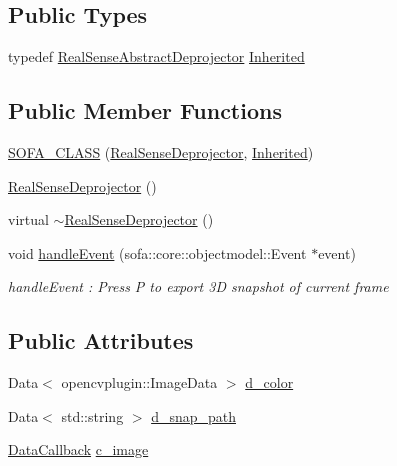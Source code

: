 \subsection*{Public Types}
\begin{DoxyCompactItemize}
\item 
typedef \hyperlink{classsofa_1_1rgbdtracking_1_1_real_sense_abstract_deprojector}{Real\+Sense\+Abstract\+Deprojector} \hyperlink{classsofa_1_1rgbdtracking_1_1_real_sense_deprojector_a6bae03808ffd8dcb3a90e7ed450cac45}{Inherited}
\end{DoxyCompactItemize}
\subsection*{Public Member Functions}
\begin{DoxyCompactItemize}
\item 
\hyperlink{classsofa_1_1rgbdtracking_1_1_real_sense_deprojector_ab83880605bbf09764e64573381b5502c}{S\+O\+F\+A\+\_\+\+C\+L\+A\+SS} (\hyperlink{classsofa_1_1rgbdtracking_1_1_real_sense_deprojector}{Real\+Sense\+Deprojector}, \hyperlink{classsofa_1_1rgbdtracking_1_1_real_sense_abstract_deprojector_a9b4cae154f99cca58b05da9c4b0084ab}{Inherited})
\item 
\hyperlink{classsofa_1_1rgbdtracking_1_1_real_sense_deprojector_af790460a9054321625fce41ed8949964}{Real\+Sense\+Deprojector} ()
\item 
virtual \hyperlink{classsofa_1_1rgbdtracking_1_1_real_sense_deprojector_ac600a5143334b96795ec161eac613aa9}{$\sim$\+Real\+Sense\+Deprojector} ()
\item 
void \hyperlink{classsofa_1_1rgbdtracking_1_1_real_sense_deprojector_aaa5648b58d79dcabc8265d7eec19b78a}{handle\+Event} (sofa\+::core\+::objectmodel\+::\+Event $\ast$event)
\begin{DoxyCompactList}\small\item\em handle\+Event \+: Press P to export 3D snapshot of current frame \end{DoxyCompactList}\end{DoxyCompactItemize}
\subsection*{Public Attributes}
\begin{DoxyCompactItemize}
\item 
Data$<$ opencvplugin\+::\+Image\+Data $>$ \hyperlink{classsofa_1_1rgbdtracking_1_1_real_sense_deprojector_a61d80c84f736effdb2ecbd41000b1bea}{d\+\_\+color}
\item 
Data$<$ std\+::string $>$ \hyperlink{classsofa_1_1rgbdtracking_1_1_real_sense_deprojector_ae6f6cf6fff6c3cc81e1370d17b627395}{d\+\_\+snap\+\_\+path}
\item 
\hyperlink{namespacesofa_1_1rgbdtracking_a00834a9204a667746fef9a402ccbfb55}{Data\+Callback} \hyperlink{classsofa_1_1rgbdtracking_1_1_real_sense_deprojector_a718873322b7771e3ddf7fa1da705ca6f}{c\+\_\+image}
\end{DoxyCompactItemize}


